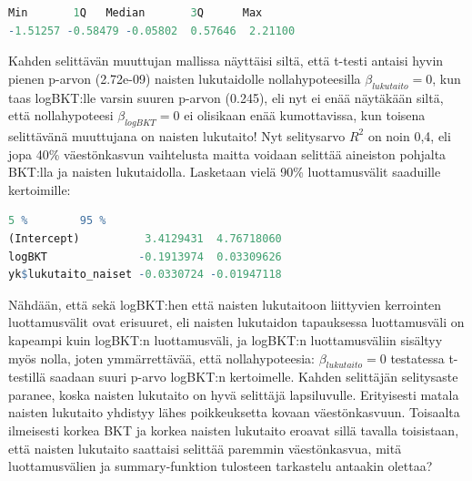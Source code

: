 \documentclass[a4paper]{article}
\begin{document}
\begin{lstlisting}[language=R]
     Min       1Q   Median       3Q      Max 
-1.51257 -0.58479 -0.05802  0.57646  2.21100 
\end{lstlisting}
Kahden selittävän muuttujan mallissa näyttäisi siltä, että t-testi antaisi hyvin pienen p-arvon (2.72e-09) naisten lukutaidolle nollahypoteesilla \(\beta_{lukutaito} = 0\), kun taas logBKT:lle varsin suuren p-arvon (0.245), eli nyt ei enää näytäkään siltä, että nollahypoteesi \(\beta_{logBKT} = 0\) ei olisikaan enää kumottavissa, kun toisena selittävänä muuttujana on naisten lukutaito! Nyt selitysarvo \(R^2\) on noin 0,4, eli jopa 40\% väestönkasvun vaihtelusta maitta voidaan selittää aineiston pohjalta BKT:lla ja naisten lukutaidolla.
Lasketaan vielä 90\% luottamusvälit saaduille kertoimille:
 \begin{lstlisting}[language=R]
                      5 %        95 %
(Intercept)          3.4129431  4.76718060
logBKT              -0.1913974  0.03309626
yk$lukutaito_naiset -0.0330724 -0.01947118
\end{lstlisting}
Nähdään, että sekä logBKT:hen että naisten lukutaitoon liittyvien kerrointen luottamusvälit ovat erisuuret, eli naisten lukutaidon tapauksessa luottamusväli on kapeampi kuin logBKT:n luottamusväli, ja logBKT:n luottamusväliin sisältyy myös nolla, joten ymmärrettävää, että nollahypoteesia:  \(\beta_{lukutaito} = 0\) testatessa t-testillä saadaan suuri p-arvo logBKT:n kertoimelle. 
Kahden selittäjän selitysaste paranee, koska naisten lukutaito on hyvä selittäjä lapsiluvulle. Erityisesti matala naisten lukutaito yhdistyy lähes poikkeuksetta kovaan väestönkasvuun. Toisaalta ilmeisesti korkea BKT ja korkea naisten lukutaito eroavat sillä tavalla toisistaan, että naisten lukutaito saattaisi selittää paremmin väestönkasvua, mitä luottamusvälien ja summary-funktion tulosteen tarkastelu antaakin olettaa?
\end{document}
